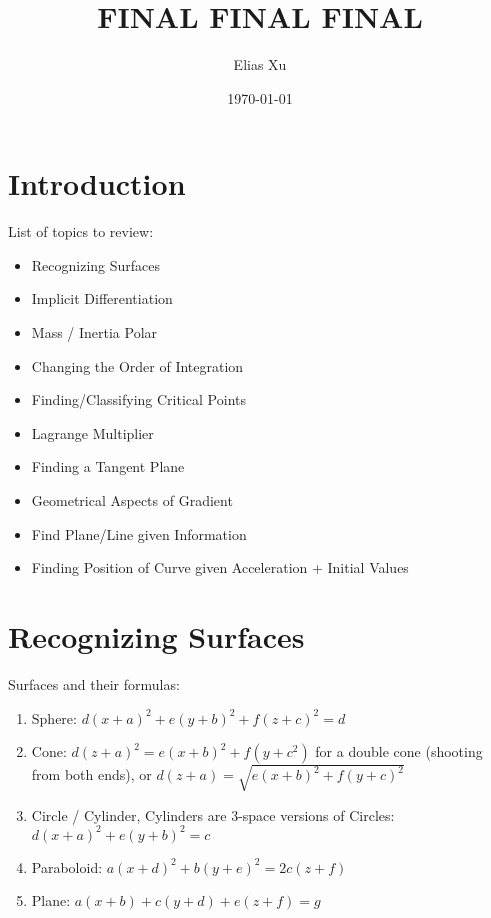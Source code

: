 \documentclass{article}
\begin{document}
\title{FINAL FINAL FINAL}
\author{Elias Xu}
\date{\today}
\maketitle

\tableofcontents

\setlength{\parindent}{0pt}

\section{Introduction}

List of topics to review:

\begin{itemize}
    \item Recognizing Surfaces
    \item Implicit Differentiation
    \item Mass / Inertia Polar
    \item Changing the Order of Integration
    \item Finding/Classifying Critical Points
    \item Lagrange Multiplier
    \item Finding a Tangent Plane
    \item Geometrical Aspects of Gradient
    \item Find Plane/Line given Information
    \item Finding Position of Curve given Acceleration + Initial Values
\end{itemize}


\section{Recognizing Surfaces}

Surfaces and their formulas:

\begin{enumerate}
    \item Sphere: $d(x+a)^2 + e(y+b)^2 + f(z+c)^2 = d$
    \item Cone: $d(z+a)^2 = e(x+b)^2 + f(y+c^2)$ for a double cone (shooting from both ends), or $d(z+a)=\sqrt{e(x+b)^2 + f(y+c)^2}$
    \item Circle / Cylinder, Cylinders are 3-space versions of Circles: $d(x+a)^2 + e(y+b)^2 = c$
    \item Paraboloid: $a(x+d)^2 + b(y+e)^2 = 2c(z+f)$
    \item Plane: $a(x+b) + c(y+d) + e(z+f) = g$
\end{enumerate}
\end{document}
